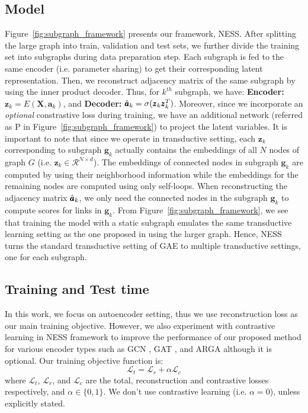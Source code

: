 \documentclass{article}
\begin{document}
\subsection{Model} 
Figure~\ref{fig:subgraph_framework} presents our framework, NESS. After splitting the large graph into train, validation and test sets, we further divide the training set into subgraphs during data preparation step. Each subgraph is fed to the same encoder (i.e. parameter sharing) to get their corresponding latent representation. Then, we reconstruct adjacency matrix of the same subgraph by using the inner product decoder. Thus, for $k^{th}$ subgraph, we have: \textbf{Encoder:} $\pmb{z}_{k}=E(\pmb{X}, \pmb{a}_k)$, and \textbf{Decoder:} $\Hat{\pmb{a}}_{k}=\sigma(\pmb{z}_{k}\pmb{z}_{k}^T)$. Moreover, since we incorporate an \textit{optional} constrastive loss during training, we have an additional network (referred as P in Figure~\ref{fig:subgraph_framework}) to project the latent variables. It is important to note that since we operate in transductive setting, each $\pmb{z}_k$ corresponding to subgraph $\pmb{g}_k$ actually contains the embeddings of all $N$ nodes of graph $G$ (i.e. $\pmb{z}_k \in \mathcal{R}^{N \times d}$). The embeddings of connected nodes in subgraph $\pmb{g}_k$ are computed by using their neighborhood information while the embeddings for the remaining nodes are computed using only self-loops. When reconstructing the adjacency matrix $\Hat{\pmb{a}}_{k}$, we only need the connected nodes in the subgraph $\pmb{g}_k$ to compute scores for links in $\pmb{g}_k$. From Figure~\ref{fig:subgraph_framework}, we see that training the model with a static subgraph emulates the same transductive learning setting as the one proposed in \citep{kipf2016variational} using the larger graph. Hence, NESS turns the standard transductive setting of GAE to multiple transductive settings, one for each subgraph.



\subsection{Training and Test time}
In this work, we focus on autoencoder setting, thus we use reconstruction loss as our main training objective. However, we also experiment with contrastive learning in NESS framework to improve the performance of our proposed method for various encoder types such as GCN \citep{kipf2016semi}, GAT \citep{velivckovic2017graph}, and ARGA \citep{pan2018adversarially} although it is optional. Our training objective function is:
\begin{equation} \label{eq2}
\mathcal{L}_t =\mathcal{L}_r+\alpha \mathcal{L}_c 
\end{equation}
where $\mathcal{L}_t$, $\mathcal{L}_r$, and $\mathcal{L}_c$ are the total, reconstruction and contrastive losses respectively, and $\alpha \in \{0,1\}$. We don't use contrastive learning (i.e. $\alpha=0$), unless explicitly stated.
\end{document}

